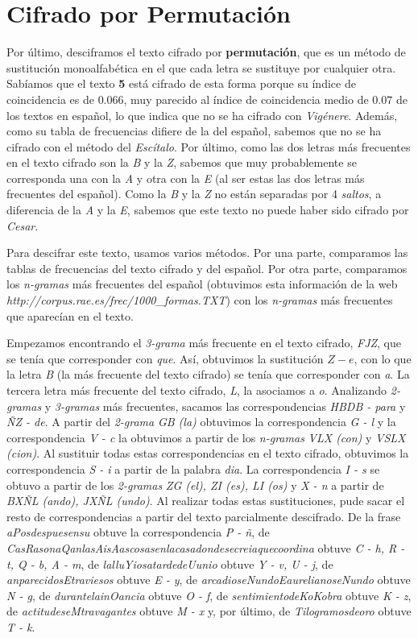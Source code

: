 \documentclass{article}
\begin{document}
\section{Cifrado por Permutación}
    Por último, desciframos el texto cifrado por \textbf{permutación}, que es un método de sustitución monoalfabética en el que cada letra se sustituye por cualquier otra. Sabíamos que el texto \textbf{5} está cifrado de esta forma porque su índice de coincidencia es de $0.066$, muy parecido al índice de coincidencia medio de $0.07$ de los textos en español, lo que indica que no se ha cifrado con \emph{Vigénere}. Además, como su tabla de frecuencias difiere de la del español, sabemos que no se ha cifrado con el método del \emph{Escítalo}. Por último, como las dos letras más frecuentes en el texto cifrado son la \emph{B} y la \emph{Z}, sabemos que muy probablemente se corresponda una con la \emph{A} y otra con la \emph{E} (al ser estas las dos letras más frecuentes del español). Como la \emph{B} y la \emph{Z} no están separadas por 4 \emph{saltos}, a diferencia de la \emph{A} y la \emph{E}, sabemos que este texto no puede haber sido cifrado por \emph{Cesar}.
    
    Para descifrar este texto, usamos varios métodos. Por una parte, comparamos las tablas de frecuencias del texto cifrado y del español. Por otra parte, comparamos los \emph{n-gramas} más frecuentes del español (obtuvimos esta información de la web \emph{http://corpus.rae.es/frec/1000\_formas.TXT}) con los \emph{n-gramas} más frecuentes que aparecían en el texto.
    
    Empezamos encontrando el \emph{3-grama} más frecuente en el texto cifrado, \emph{FJZ}, que se tenía que corresponder con \emph{que}. Así, obtuvimos la sustitución $Z - e$, con lo que la letra \emph{B} (la más frecuente del texto cifrado) se tenía que corresponder con \emph{a}. La tercera letra más frecuente del texto cifrado, \emph{L}, la asociamos a \emph{o}. Analizando \emph{2-gramas} y \emph{3-gramas} más frecuentes, sacamos las correspondencias \emph{HBDB - para} y \emph{ÑZ - de}. A partir del \emph{2-grama} \emph{GB (la)} obtuvimos la correspondencia \emph{G - l} y la correspondencia \emph{V - c} la obtuvimos a partir de los \emph{n-gramas} \emph{VLX (con)} y \emph{VSLX (cion)}. Al sustituir todas estas correspondencias en el texto cifrado, obtuvimos la correspondencia \emph{S - i} a partir de la palabra \emph{dia}. La correspondencia \emph{I - s} se obtuvo a partir de los \emph{2-gramas} \emph{ZG (el), ZI (es), LI (os)} y \emph{X - n} a partir de \emph{BXÑL (ando), JXÑL (undo)}. Al realizar todas estas sustituciones, pude sacar el resto de correspondencias a partir del texto parcialmente descifrado. De la frase \emph{aPosdespuesensu} obtuve la correspondencia \emph{P - ñ}, de \emph{CasRasonaQanlasAisAascosasenlacasadondesecreiaquecoordina} obtuve \emph{C - h, R - t, Q - b, A - m}, de \emph{lalluYiosatardedeUunio} obtuve \emph{Y - v, U - j}, de \emph{anparecidosEtraviesos} obtuve \emph{E - y}, de \emph{arcadioseNundoEaurelianoseNundo} obtuve \emph{N - g}, de \emph{durantelainOancia} obtuve \emph{O - f}, de \emph{sentimientodeKoKobra} obtuve \emph{K - z}, de \emph{actitudeseMtravagantes} obtuve \emph{M - x} y, por último, de \emph{Tilogramosdeoro} obtuve \emph{T - k}.
    
\end{document}

